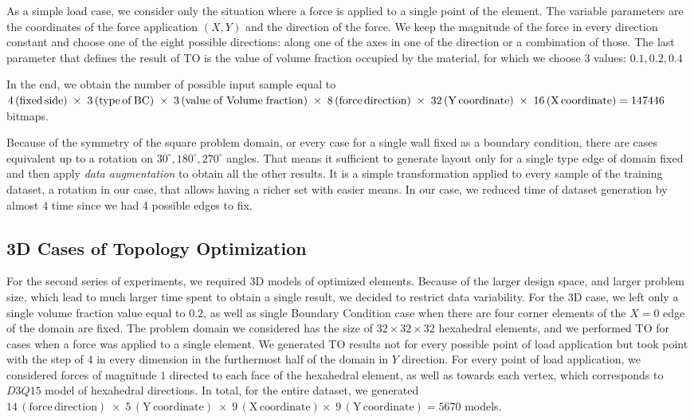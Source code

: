 As a simple load case, we consider only the situation where a force is applied to a single point of the element. 
The variable parameters are the coordinates of the force application $(X, Y)$ and the direction of the force.
We keep the magnitude of the force in every direction constant and choose one of the eight possible directions: along one of the axes in one of the direction or a combination of those.
The last parameter that defines the result of TO is the value of volume fraction occupied by the material, for which we choose $3$ values: $0.1, 0.2, 0.4$
\medskip

In the end, we obtain the number of possible input sample equal to $ 4\,\mathrm{(fixed \, side)} \; \times \; 3\,\mathrm{(type \, of \, BC)} \\ \; \times \; 3\,\mathrm{(value \; of \; Volume \; fraction)} \; \times \; 8\,\mathrm{(force \, direction)} \; \times \; 32\,\mathrm{(Y \, coordinate)} \; \times \; 16\,\mathrm{(X \, coordinate)} = 147446 $ bitmaps.
\medskip

Because of the symmetry of the square problem domain, or every case for a single wall fixed as a boundary condition, there are cases equivalent up to a rotation on $ 30^\circ, 180^\circ, 270^\circ $ angles.
That means it sufficient to generate layout only for a single type edge of domain fixed and then apply \emph{data augmentation} to obtain all the other results.
It is a simple transformation applied to every sample of the training dataset, a rotation in our case, that allows having a richer set with easier means.
In our case, we reduced time of dataset generation by almost $4$ time since we had 4 possible edges to fix.
\medskip

\subsection{3D Cases of Topology Optimization}

For the second series of experiments, we required 3D models of optimized elements.
Because of the larger design space, and larger problem size, which lead to much larger time spent to obtain a single result, we decided to restrict data variability.
For the 3D case, we left only a single volume fraction value equal to $0.2$, as well as single Boundary Condition case when there are four corner elements of the $ X=0 $ edge of the domain are fixed.
The problem domain we considered has the size of $32 \times 32 \times 32$ hexahedral elements, and we performed TO for cases when a force was applied to a single element. 
We generated TO results not for every possible point of load application but took point with the step of 4 in every dimension in the furthermost half of the domain in $Y$ direction. 
For every point of load application, we considered forces of magnitude $1$ directed to each face of the hexahedral element, as well as towards each vertex, which corresponds to $D3Q15$ model of hexahedral directions. 
In total, for the entire dataset, we generated $ 14\,\mathrm{(force \, direction)} \; \times \; 5\,\mathrm{(Y \, coordinate)} \; \times \; 9\,\mathrm{(X \, coordinate)} \times \; 9\,\mathrm{(Y \, coordinate)} = 5670 $ models.
\medskip

